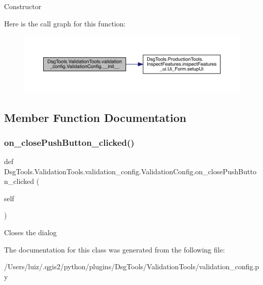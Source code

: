 \begin{DoxyVerb}Constructor
\end{DoxyVerb}
 Here is the call graph for this function\+:
\nopagebreak
\begin{figure}[H]
\begin{center}
\leavevmode
\includegraphics[width=350pt]{class_dsg_tools_1_1_validation_tools_1_1validation__config_1_1_validation_config_a50efdd96364ee73a5ca76dd868a3cb11_cgraph}
\end{center}
\end{figure}


\subsection{Member Function Documentation}
\mbox{\label{class_dsg_tools_1_1_validation_tools_1_1validation__config_1_1_validation_config_abd8829244c6371f975c074914d8770ca}} 
\subsubsection{\texorpdfstring{on\+\_\+close\+Push\+Button\+\_\+clicked()}{on\_closePushButton\_clicked()}}
{\footnotesize\ttfamily def Dsg\+Tools.\+Validation\+Tools.\+validation\+\_\+config.\+Validation\+Config.\+on\+\_\+close\+Push\+Button\+\_\+clicked (\begin{DoxyParamCaption}\item[{}]{self }\end{DoxyParamCaption})}

\begin{DoxyVerb}Closes the dialog
\end{DoxyVerb}
 

The documentation for this class was generated from the following file\+:\begin{DoxyCompactItemize}
\item 
/\+Users/luiz/.\+qgis2/python/plugins/\+Dsg\+Tools/\+Validation\+Tools/validation\+\_\+config.\+py\end{DoxyCompactItemize}
